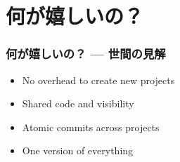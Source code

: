\section{何が嬉しいの？}
\begin{frame}
    \frametitle{何が嬉しいの？ --- 世間の見解}
    \begin{itemize}
        \item No overhead to create new projects
        \item Shared code and visibility
        \item Atomic commits across projects
        \item One version of everything
    \end{itemize}
\end{frame}

